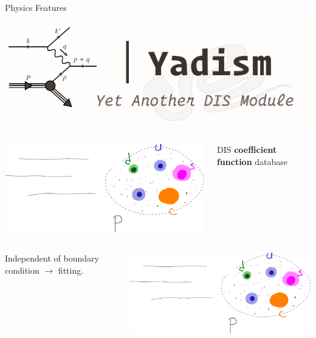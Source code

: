 \documentclass[9pt]{beamer}
\begin{document}
\begin{frame}{\yadism{} Physics Features}
	\begin{center}
		\includegraphics[width=.4\linewidth]{yadism.pdf}
	\end{center}

    \begin{columns}
        \begin{column}{0.5\textwidth}
            \begin{center}
                \includegraphics[width=0.6\linewidth]{intrinsic}
            \end{center}
        \end{column}
        \begin{column}{0.4\textwidth}
            DIS \textbf{coefficient function} database
        \end{column}
    \end{columns}

    \begin{columns}
        \begin{column}{0.4\textwidth}
            Independent of boundary condition $\to$ \pdf fitting.
        \end{column}
        \begin{column}{0.5\textwidth}
            \begin{center}
                \includegraphics[width=0.6\linewidth]{intrinsic}
            \end{center}
        \end{column}
    \end{columns}


\end{frame}
\end{document}
